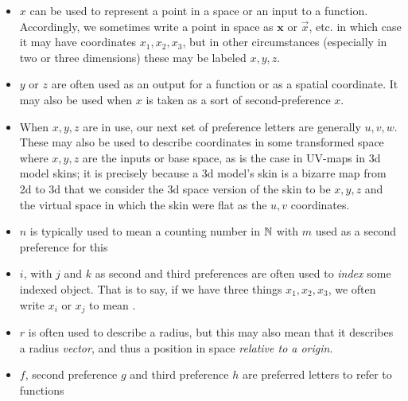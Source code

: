 \documentclass[11pt]{article}
\begin{document}
\begin{itemize}
\item $x$ can be used to represent a point in a space or an input to a function. Accordingly, we sometimes write a point in space as $\mathbf{x}$ or $\vec{x}$, etc. in which case it may have coordinates $x_1,x_2,x_3$, but in other circumstances (especially in two or three dimensions) these may be labeled $x,y,z$.
\item $y$ or $z$ are often used as an output for a function or as a spatial coordinate. It may also be used when $x$ is taken as a sort of second-preference $x$.
\item When $x,y,z$ are in use, our next set of preference letters are generally $u,v,w$. These may also be used to describe coordinates in some transformed space where $x,y,z$ are the inputs or base space, as is the case in UV-maps in 3d model skins; it is precisely because a 3d model's skin is a bizarre map from 2d to 3d that we consider the 3d space version of the skin to be $x,y,z$ and the virtual space in which the skin were flat as the $u,v$ coordinates.
\item $n$ is typically used to mean a counting number in $\mathbb{N}$ with $m$ used as a second preference for this
\item $i$, with $j$ and $k$ as second and third preferences are often used to \emph{index} some indexed object. That is to say, if we have three things $x_1,x_2,x_3$, we often write $x_i$ or $x_j$ to mean .
\item $r$ is often used to describe a radius, but this may also mean that it describes a radius \emph{vector}, and thus a position in space \emph{relative to a origin}.

\item $f$, second preference $g$ and third preference $h$ are preferred letters to refer to functions


\end{itemize}
\end{document}
